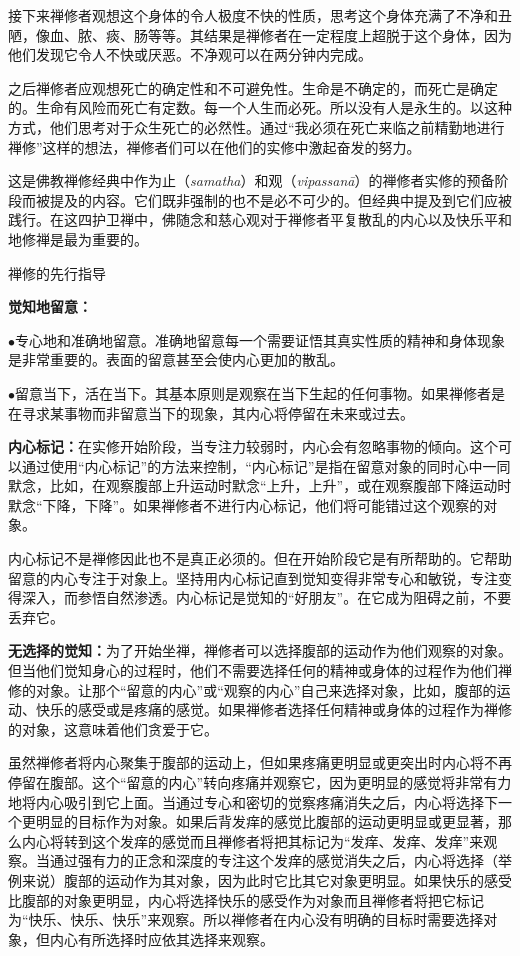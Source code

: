 接下来禅修者观想这个\1身体的令人极度不快的性质，思考这个身体充满了不净和丑陋，像血、脓、痰、肠等等。其结果是禅修者在一定程度上超脱于这个身体，因为他们发现它令人不快或厌恶。不净观可以在两分钟内完成。

之后禅修者应观想死亡的确定性和不可避免性。生命是不确定的，而死亡是确定的。生命有风险而死亡有定数。每一个人生而必死。所以没有人是永生的。以这种方式，他们思考对于众生死亡的必然性。通过“我必须在死亡来临之前精勤地进行禅修”这样的想法，禅修者们可以在他们的实修中激起奋发的努力。

这是佛教禅修经典中作为止（{\it samatha}）和观（{\it vipassan\=a}）的禅修者实修的预备阶段而被提及的内容。它们既非强制的也不是必不可少的。但经典中提及到它们应被践行。在这四护卫禅中，佛随念和慈心观对于禅修者平复散乱的内心以及快乐平和地修禅是最为重要的。

\ssssubsectnonb 禅修的先行指导

{\bf 觉知地留意：}

$\bullet$专心地和准确地留意。准确地留意每一个需要证悟其真实性质的精神和身体现象是非常重要的。表面的留意甚至会使内心更加的散乱。

$\bullet$留意当下，活在当下。其基本原则是观察\1在当下生起的任何事物。如果禅修者是在寻求某事物而非留意当下的现象，其内心将停留在未来或过去。


{\bf 内心标记：}在实修开始阶段，当专注力较弱时，内心会有忽略事物的倾向。这个可以通过使用“内心标记”的方法来控制，“内心标记”是指在留意对象的同时心中一同默念，比如，在观察腹部上升运动时默念“上升，上升”，或在观察腹部下降运动时默念“下降，下降”。如果禅修者不进行内心标记，他们将可能错过这个观察的对象。

内心标记不是禅修因此也不是真正必须的。但在开始阶段它是有所帮助的。它帮助留意的内心专注于对象上。坚持用内心标记直到觉知变得非常专心和敏锐，专注变得深入，而参悟自然渗透。内心标记是觉知的“好朋友”。在它成为阻碍之前，不要丢弃它。

{\bf 无选择的觉知：}为了开始坐禅，禅修者可以选择腹部的运动作为他们观察的对象。但当他们觉知身心的过程时，他们不需要选择任何的精神或身体的过程作为他们禅修的对象。让那个“留意的内心”或“观察的内心”自己来选择对象，比如，腹部的运动、快乐的感受或是疼痛的感觉。如果禅修者选择任何精神或身体的过程作为禅修的对象，这意味着他们贪爱于它。

\1虽然禅修者将内心聚集于腹部的运动上，但如果疼痛更明显或更突出时内心将不再停留在腹部。这个“留意的内心”转向疼痛并观察它，因为更明显的感觉将非常有力地将内心吸引到它上面。当通过专心和密切的觉察疼痛消失之后，内心将选择下一个更明显的目标作为对象。如果后背发痒的感觉比腹部的运动更明显或更显著，那么内心将转到这个发痒的感觉而且禅修者将把其标记为“发痒、发痒、发痒”来观察。当通过强有力的正念和深度的专注这个发痒的感觉消失之后，内心将选择（举例来说）腹部的运动作为其对象，因为此时它比其它对象更明显。如果快乐的感受比腹部的对象更明显，内心将选择快乐的感受作为对象而且禅修者将把它标记为“快乐、快乐、快乐”来观察。所以禅修者在内心没有明确的目标时需要选择对象，但内心有所选择时应依其选择来观察。

